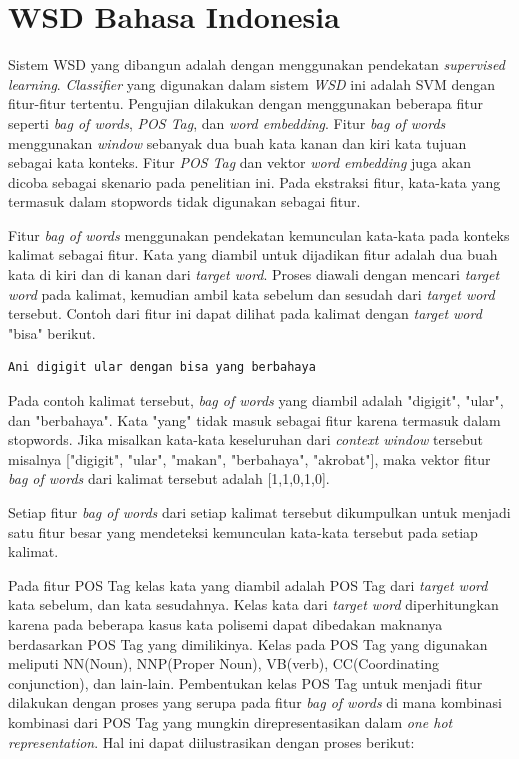 \section{WSD Bahasa Indonesia} \label{sec:Sistem WSD}
Sistem WSD yang dibangun adalah dengan menggunakan pendekatan \textit{supervised learning}. \textit{Classifier} yang digunakan dalam sistem \textit{WSD} ini adalah SVM dengan fitur-fitur tertentu. Pengujian dilakukan dengan menggunakan beberapa fitur seperti \textit{bag of words}, \textit{POS Tag}, dan \textit{word embedding}. Fitur \textit{bag of words} menggunakan \textit{window} sebanyak dua buah kata kanan dan kiri kata tujuan sebagai kata konteks. Fitur \textit{POS Tag} dan vektor \textit{word embedding} juga akan dicoba sebagai skenario pada penelitian ini. Pada ekstraksi fitur, kata-kata yang termasuk dalam stopwords \citep{tala2003study} tidak digunakan sebagai fitur.

Fitur \textit{bag of words} menggunakan pendekatan kemunculan kata-kata pada konteks kalimat sebagai fitur. Kata yang diambil untuk dijadikan fitur adalah dua buah kata di kiri dan di kanan dari \textit{target word}. Proses diawali dengan mencari \textit{target word} pada kalimat, kemudian ambil kata sebelum dan sesudah dari \textit{target word} tersebut. Contoh dari fitur ini dapat dilihat pada kalimat dengan \textit{target word} "bisa" berikut.
\begin{lstlisting}[backgroundcolor = \color{white}]
Ani digigit ular dengan bisa yang berbahaya
\end{lstlisting}
Pada contoh kalimat tersebut, \textit{bag of words} yang diambil adalah "digigit", "ular", dan "berbahaya". Kata "yang" tidak masuk sebagai fitur karena termasuk dalam stopwords. Jika misalkan kata-kata keseluruhan dari \textit{context window} tersebut misalnya ["digigit", "ular", "makan", "berbahaya", "akrobat"], maka vektor fitur \textit{bag of words} dari kalimat tersebut adalah [1,1,0,1,0].

Setiap fitur \textit{bag of words} dari setiap kalimat tersebut dikumpulkan untuk menjadi satu fitur besar yang mendeteksi kemunculan kata-kata tersebut pada setiap kalimat.

Pada fitur POS Tag kelas kata yang diambil adalah POS Tag dari \textit{target word} kata sebelum, dan kata sesudahnya. Kelas kata dari \textit{target word} diperhitungkan karena pada beberapa kasus kata polisemi dapat dibedakan maknanya berdasarkan POS Tag yang dimilikinya. Kelas pada POS Tag yang digunakan meliputi NN(Noun), NNP(Proper Noun), VB(verb), CC(Coordinating conjunction), dan lain-lain. Pembentukan kelas POS Tag untuk menjadi fitur dilakukan dengan proses yang serupa pada fitur \textit{bag of words} di mana kombinasi kombinasi dari POS Tag yang mungkin direpresentasikan dalam \textit{one hot representation}. Hal ini dapat diilustrasikan dengan proses berikut:

